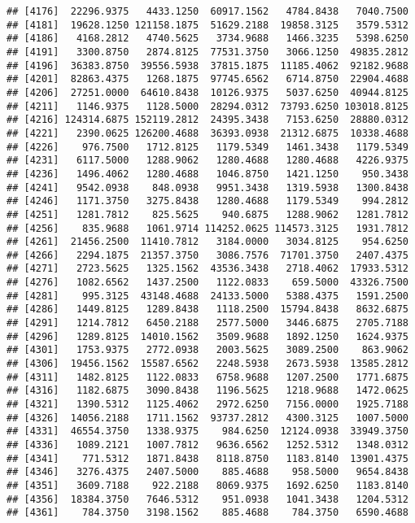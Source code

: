 \documentclass[]{article}
\begin{document}
\begin{verbatim}
## [4176]  22296.9375   4433.1250  60917.1562   4784.8438   7040.7500
## [4181]  19628.1250 121158.1875  51629.2188  19858.3125   3579.5312
## [4186]   4168.2812   4740.5625   3734.9688   1466.3235   5398.6250
## [4191]   3300.8750   2874.8125  77531.3750   3066.1250  49835.2812
## [4196]  36383.8750  39556.5938  37815.1875  11185.4062  92182.9688
## [4201]  82863.4375   1268.1875  97745.6562   6714.8750  22904.4688
## [4206]  27251.0000  64610.8438  10126.9375   5037.6250  40944.8125
## [4211]   1146.9375   1128.5000  28294.0312  73793.6250 103018.8125
## [4216] 124314.6875 152119.2812  24395.3438   7153.6250  28880.0312
## [4221]   2390.0625 126200.4688  36393.0938  21312.6875  10338.4688
## [4226]    976.7500   1712.8125   1179.5349   1461.3438   1179.5349
## [4231]   6117.5000   1288.9062   1280.4688   1280.4688   4226.9375
## [4236]   1496.4062   1280.4688   1046.8750   1421.1250    950.3438
## [4241]   9542.0938    848.0938   9951.3438   1319.5938   1300.8438
## [4246]   1171.3750   3275.8438   1280.4688   1179.5349    994.2812
## [4251]   1281.7812    825.5625    940.6875   1288.9062   1281.7812
## [4256]    835.9688   1061.9714 114252.0625 114573.3125   1931.7812
## [4261]  21456.2500  11410.7812   3184.0000   3034.8125    954.6250
## [4266]   2294.1875  21357.3750   3086.7576  71701.3750   2407.4375
## [4271]   2723.5625   1325.1562  43536.3438   2718.4062  17933.5312
## [4276]   1082.6562   1437.2500   1122.0833    659.5000  43326.7500
## [4281]    995.3125  43148.4688  24133.5000   5388.4375   1591.2500
## [4286]   1449.8125   1289.8438   1118.2500  15794.8438   8632.6875
## [4291]   1214.7812   6450.2188   2577.5000   3446.6875   2705.7188
## [4296]   1289.8125  14010.1562   3509.9688   1892.1250   1624.9375
## [4301]   1753.9375   2772.0938   2003.5625   3089.2500    863.9062
## [4306]  19456.1562  15587.6562   2248.5938   2673.5938  13585.2812
## [4311]   1482.8125   1122.0833   6758.9688   1207.2500   1771.6875
## [4316]   1182.6875   3090.8438   1196.5625   1218.9688   1472.0625
## [4321]   1390.5312   1125.4062   2972.6250   7156.0000   1925.7188
## [4326]  14056.2188   1711.1562  93737.2812   4300.3125   1007.5000
## [4331]  46554.3750   1338.9375    984.6250  12124.0938  33949.3750
## [4336]   1089.2121   1007.7812   9636.6562   1252.5312   1348.0312
## [4341]    771.5312   1871.8438   8118.8750   1183.8140  13901.4375
## [4346]   3276.4375   2407.5000    885.4688    958.5000   9654.8438
## [4351]   3609.7188    922.2188   8069.9375   1692.6250   1183.8140
## [4356]  18384.3750   7646.5312    951.0938   1041.3438   1204.5312
## [4361]    784.3750   3198.1562    885.4688    784.3750   6590.4688

\end{verbatim}
\end{document}
